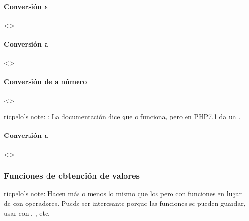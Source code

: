 \documentclass[a4paper,12pt,spanish]{sphinxmanual}
\begin{document}
\paragraph{Conversión a }
\label{\detokenize{php:conversion-a-int}}
\textless{}\textgreater{}


\paragraph{Conversión a }
\label{\detokenize{php:conversion-a-float}}
\textless{}\textgreater{}


\paragraph{Conversión de  a número}
\label{\detokenize{php:conversion-de-string-a-numero}}
\textless{}\textgreater{}

ricpelo’s note: : La documentación dice que 
o  funciona, pero en PHP7.1 da un .


\paragraph{Conversión a }
\label{\detokenize{php:conversion-a-string}}
\textless{}\textgreater{}


\subsubsection{Funciones de obtención de valores}
\label{\detokenize{php:funciones-de-obtencion-de-valores}}
ricpelo’s note: Hacen más o menos lo mismo que los  pero con
funciones en lugar de con operadores. Puede ser interesante porque las
funciones se pueden guardar, usar con , , etc.
\end{document}
